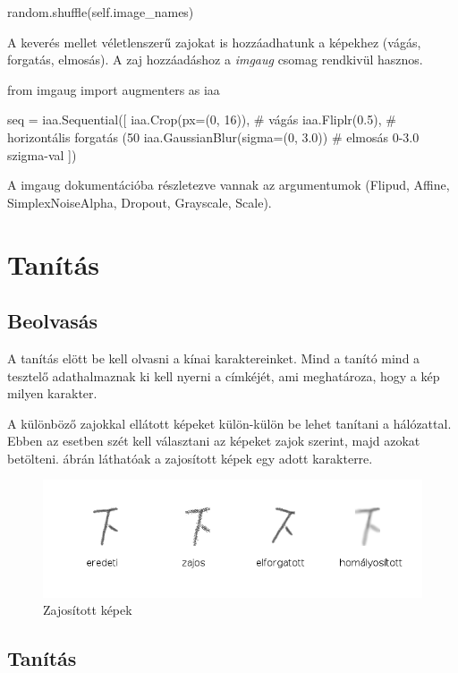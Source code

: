 \begin{python}
random.shuffle(self.image_names)
\end{python}

A keverés mellet véletlenszerű zajokat is hozzáadhatunk a képekhez (vágás, forgatás, elmosás). A zaj hozzáadáshoz a \textit{imgaug} csomag rendkivül hasznos.

\begin{python}
from imgaug import augmenters as iaa

seq = iaa.Sequential([
    iaa.Crop(px=(0, 16)), # vágás 
    iaa.Fliplr(0.5), # horizontális forgatás (50%
    iaa.GaussianBlur(sigma=(0, 3.0)) # elmosás 0-3.0 szigma-val
])
\end{python}

A imgaug dokumentációba részletezve vannak az argumentumok (Flipud, Affine, SimplexNoiseAlpha, Dropout, Grayscale, Scale).

\section{Tanítás}

\subsection{Beolvasás}
A tanítás elött be kell olvasni a kínai karaktereinket. Mind a tanító mind a tesztelő adathalmaznak ki kell nyerni a címkéjét, ami meghatároza, hogy a kép milyen karakter.

A különböző zajokkal ellátott képeket külön-külön be lehet tanítani a hálózattal. Ebben az esetben szét kell választani az képeket zajok szerint, majd azokat betölteni.  ábrán láthatóak a zajosított képek egy adott karakterre.

\begin{figure}[h]
	\centering
	\includegraphics[scale=0.45]{images/pictures_with_noise}
	\caption{Zajosított képek}
	\label{fig:noisy_picture}
\end{figure}

\subsection{Tanítás}

